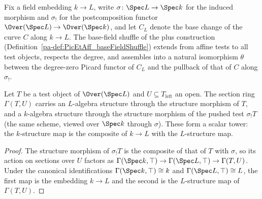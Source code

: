 Fix a field embedding \(k \to L\), write \(\sigma \colon \Spec L \to \Spec k\) for the
induced morphism and \(\sigma_{!}\) for the postcomposition functor
\(\Over(\Spec L) \to \Over(\Spec k)\), and let \(C_L\) denote the base change of the
curve \(C\) along \(k \to L\).  The base-field shuffle of the plus construction
(Definition~\ref{pa-def:PicEtAff_baseFieldShuffle}) extends from affine tests to all test
objects, respects the degree, and assembles into a natural isomorphism \(\theta\)
between the degree-zero Picard functor of \(C_L\) and the pullback of that of \(C\)
along \(\sigma_{!}\).

\begin{lemma}
  \label{pa-lem:isScalarTower_sections_map}
  \leanok

  Let \(T\) be a test object of \(\Over(\Spec L)\) and \(U \subseteq T_{\mathrm{left}}\)
  an open.  The section ring \(\Gamma(T, U)\) carries an \(L\)-algebra structure
  through the structure morphism of \(T\), and a \(k\)-algebra structure through the
  structure morphism of the pushed test \(\sigma_{!}T\) (the same scheme, viewed over
  \(\Spec k\) through \(\sigma\)).  These form a scalar tower: the \(k\)-structure map
  is the composite of \(k \to L\) with the \(L\)-structure map.
\end{lemma}
\begin{proof}
  \leanok
  The structure morphism of \(\sigma_{!}T\) is the composite of that of \(T\) with
  \(\sigma\), so its action on sections over \(U\) factors as
  \(\Gamma(\Spec k, \top) \to \Gamma(\Spec L, \top) \to \Gamma(T, U)\).  Under the
  canonical identifications \(\Gamma(\Spec k, \top) \cong k\) and
  \(\Gamma(\Spec L, \top) \cong L\), the first map is the embedding \(k \to L\) and
  the second is the \(L\)-structure map of \(\Gamma(T, U)\).
\end{proof}

